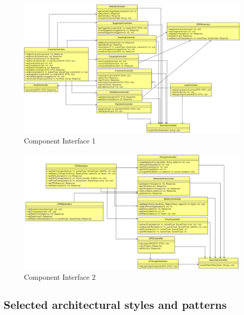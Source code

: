 \begin{figure}[H]
    \begin{center}
        \includegraphics[width=\textwidth]{img/ComponentInterface1.PNG}
        \caption{Component Interface 1}\label{component_interface1}
    \end{center}
\end{figure}

\begin{figure}[H]
    \begin{center}
        \includegraphics[width=\textwidth]{img/ComponentInterface2.PNG}
        \caption{Component Interface 2}\label{component_interface2}
    \end{center}
\end{figure}

\subsection{Selected architectural styles and patterns}

